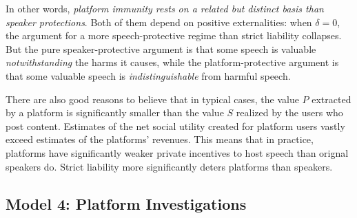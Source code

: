 In other words, \emph{platform immunity rests on a related but distinct basis than speaker protections}. Both of them depend on positive externalities: when $\delta = 0$, the argument for a more speech-protective regime than strict liability collapses. But the pure speaker-protective argument is that some speech is valuable \emph{notwithstanding} the harms it causes, while the platform-protective argument is that some valuable speech is \emph{indistinguishable} from harmful speech.

There are also good reasons to believe that in typical cases, the value $P$ extracted by a platform is significantly smaller than the value $S$ realized by the users who post content. Estimates of the net social utility created for platform users vastly exceed estimates of the platforms' revenues. This means that in practice, platforms have significantly weaker private incentives to host speech than orignal speakers do. Strict liability more significantly deters platforms than speakers.

\subsection{Model 4: Platform Investigations}


